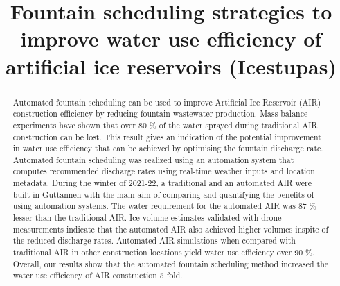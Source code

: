 \documentclass[tc, manuscript]{copernicus}
\begin{document}
\title{Fountain scheduling strategies to improve water use efficiency of artificial
ice reservoirs (Icestupas)}

\def\Authors{Suryanarayanan Balasubramanian\,$^{1}$, Roger Waser\,$^{2}$, Martin Hoelzle\,$^{1}$}
\def\Address{$^{1}$University of Fribourg, Department of Geosciences, Fribourg, Switzerland $^{2}$University of
Applied Sciences and Arts, Luzern, Switzerland} \def\corrAuthor{Suryanarayanan Balasubramanian}





\maketitle

\begin{abstract}

  Automated fountain scheduling can be used to improve Artificial Ice Reservoir (AIR) construction efficiency by
  reducing fountain wastewater production. Mass balance experiments have shown that over 80 \% of the water
  sprayed during traditional AIR construction can be lost. This result gives an indication of the potential
  improvement in water use efficiency that can be achieved by optimising the fountain discharge rate. Automated
  fountain scheduling was realized using an automation system that computes recommended discharge rates using
  real-time weather inputs and location metadata. During the winter of 2021-22, a traditional and an automated
  AIR were built in Guttannen with the main aim of comparing and quantifying the benefits of using automation
  systems. The water requirement for the automated AIR was 87 \% lesser than the traditional AIR. Ice volume
  estimates validated with drone measurements indicate that the automated AIR also achieved higher volumes
  inspite of the reduced discharge rates. Automated AIR simulations when compared with traditional AIR in other
  construction locations yield water use efficiency over 90 \%. Overall, our results show that the automated
  fountain scheduling method increased the water use efficiency of AIR construction 5 fold.

\end{abstract}
\end{document}

